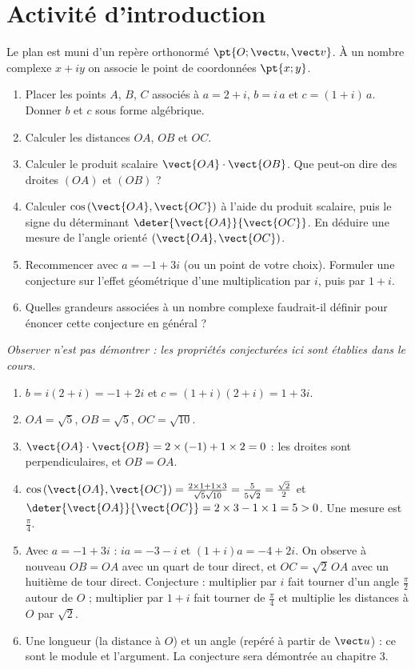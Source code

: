 \mxnewpage
\section{Activité d'introduction}
\begin{activity}
Le plan est muni d'un repère orthonormé $\pt{O;\vect u,\vect v}$. À un nombre complexe $x+iy$ on associe le point de coordonnées $\pt{x;y}$.
\begin{enumerate}
\item Placer les points $A$, $B$, $C$ associés à $a=2+i$, $b=i\,a$ et $c=(1+i)\,a$. Donner $b$ et $c$ sous forme algébrique.
\item Calculer les distances $OA$, $OB$ et $OC$.
\item Calculer le produit scalaire $\vect{OA}\cdot\vect{OB}$. Que peut-on dire des droites $(OA)$ et $(OB)$ ?
\item Calculer $\cos\left(\vect{OA},\vect{OC}\right)$ à l'aide du produit scalaire, puis le signe du déterminant $\deter{\vect{OA}}{\vect{OC}}$. En déduire une mesure de l'angle orienté $\left(\vect{OA},\vect{OC}\right)$.
\item Recommencer avec $a=-1+3i$ (ou un point de votre choix). Formuler une conjecture sur l'effet géométrique d'une multiplication par $i$, puis par $1+i$.
\item Quelles grandeurs associées à un nombre complexe faudrait-il définir pour énoncer cette conjecture en général ?
\end{enumerate}
\par\emph{Observer n'est pas démontrer : les propriétés conjecturées ici sont établies dans le cours.}
\end{activity}
\begin{solution}[Activité]
\begin{enumerate}
\item $b=i(2+i)=-1+2i$ et $c=(1+i)(2+i)=1+3i$.
\item $OA=\sqrt5$, $OB=\sqrt5$, $OC=\sqrt{10}$.
\item $\vect{OA}\cdot\vect{OB}=2\times(-1)+1\times2=0$ : les droites sont perpendiculaires, et $OB=OA$.
\item $\cos\left(\vect{OA},\vect{OC}\right)=\frac{2\times1+1\times3}{\sqrt5\sqrt{10}}=\frac{5}{5\sqrt2}=\frac{\sqrt2}2$ et $\deter{\vect{OA}}{\vect{OC}}=2\times3-1\times1=5>0$. Une mesure est $\frac\pi4$.
\item Avec $a=-1+3i$ : $ia=-3-i$ et $(1+i)a=-4+2i$. On observe à nouveau $OB=OA$ avec un quart de tour direct, et $OC=\sqrt2\,OA$ avec un huitième de tour direct. Conjecture : multiplier par $i$ fait tourner d'un angle $\frac\pi2$ autour de $O$ ; multiplier par $1+i$ fait tourner de $\frac\pi4$ et multiplie les distances à $O$ par $\sqrt2$.
\item Une longueur (la distance à $O$) et un angle (repéré à partir de $\vect u$) : ce sont le module et l'argument. La conjecture sera démontrée au chapitre 3.
\end{enumerate}
\end{solution}
